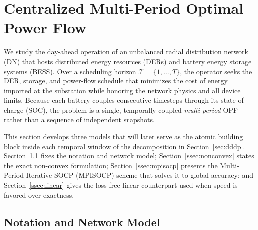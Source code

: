 
\section{Centralized Multi-Period Optimal Power Flow}
\label{sec:copf}

We study the day-ahead operation of an unbalanced radial distribution
network (DN) that hosts distributed energy resources (DERs) and battery
energy storage systems (BESS). Over a scheduling horizon
$\mathcal{T}=\{1,\dots,T\}$, the operator seeks the DER, storage, and
power-flow schedule that minimizes the cost of energy imported at the
substation while honoring the network physics and all device limits.
Because each battery couples consecutive timesteps through its
state of charge (SOC), the problem is a single, temporally coupled
\emph{multi-period} OPF rather than a sequence of independent snapshots.

This section develops three models that will later serve as the atomic
building block inside each temporal window of the decomposition in
Section~\ref{sec:dddp}. Section~\ref{ssec:notation} fixes the notation
and network model; Section~\ref{ssec:nonconvex} states the exact
non-convex formulation; Section~\ref{ssec:mpisocp} presents the
Multi-Period Iterative SOCP (MPISOCP) scheme that solves it to global
accuracy; and Section~\ref{ssec:linear} gives the loss-free linear
counterpart used when speed is favored over exactness.

\subsection{Notation and Network Model}
\label{ssec:notation}

